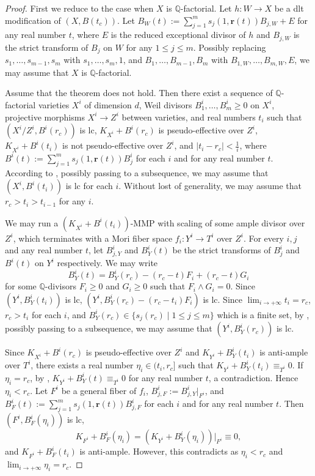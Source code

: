 \documentclass[11pt]{amsart}
\numberwithin{equation}{section}
\newcommand{\Qq}{\mathbb{Q}}
\theoremstyle{definition}
\theoremstyle{definition}
\begin{document}
\begin{proof}
First we reduce to the case when $X$ is $\Qq$-factorial. Let $h: W\rightarrow X$ be a dlt modification of $(X,B(t_c))$. Let $B_W(t):=\sum_{j=1}^ms_j(1,\bm{r}(t))B_{j,W}+E$ for any real number $t$, where $E$ is the reduced exceptional divisor of $h$ and $B_{j,W}$ is the strict transform of $B_j$ on $W$ for any $1\le j\le m$. Possibly replacing $s_1,\dots,s_{m-1},s_m$ with $s_1,\dots,s_{m},1$, and $B_1,\dots,B_{m-1},B_m$ with $B_{1,W},\dots,B_{m,W},E$, we may assume that $X$ is $\Qq$-factorial.

Assume that the theorem does not hold. Then there exist a sequence of $\Qq$-factorial varieties $X^i$ of dimension $d$, Weil divisors $B_1^i,\dots,B_m^i\ge0$ on $X^i$, projective morphisms $X^i\to Z^i$ between varieties, and real numbers $t_i$ such that $(X^i/Z^i,B^i(r_c))$ is lc, $K_{X^i}+B^i(r_c)$ is pseudo-effective over $Z^i$, $K_{X^i}+B^i(t_i)$ is not pseudo-effective over $Z^i$, and $|t_i-r_c|<\frac{1}{i}$, where $B^i(t):=\sum_{j=1}^ms_j(1,\bm{r}(t))B^i_j$ for each $i$ and for any real number $t$. According to \cite[Corollary 5.5]{HLS19}, possibly passing to a subsequence, we may assume that  $(X^i,B^i(t_i))$ is lc for each $i$. Without lost of generality, we may assume that $r_c>t_i>t_{i-1}$ for any $i$.

We may run a $(K_{X^i}+B^i(t_i))$-MMP with scaling of some ample divisor over $Z^i$, which terminates with a Mori fiber space $f_i: Y^i\rightarrow T^i$ over $Z^i$. For every $i,j$ and any real number $t$, let $B^i_{j,Y}$ and $B^i_Y(t)$ be the strict transforms of $B^i_j$ and $B^i(t)$ on $Y^i$ respectively. We may write
$$B^i_Y(t)=B^i_Y(r_c)-(r_c-t)F_i+(r_c-t)G_i$$
for some $\Qq$-divisors $F_i\geq 0$ and $G_i\geq 0$ such that $F_i\wedge G_i=0$. Since $(Y^i,B^i_Y(t_i))$ is lc, $(Y^i,B^i_Y(r_c)-(r_c-t_i)F_i)$ is lc. Since $\lim_{i\rightarrow+\infty}t_i=r_c$, $r_c>t_i$ for each $i$, and $B^i_Y(r_c)\in\{s_j(r_c)\mid 1\le j\le m\}$ which is a finite set, by \cite[Theorem 1.4]{HMX14}, possibly passing to a subsequence, we may assume that $(Y^i,B^i_Y(r_c))$ is lc.

Since $K_{X^i}+B^i(r_c)$ is pseudo-effective over $Z^i$ and $K_{Y^i}+B^i_Y(t_i)$ is anti-ample over $T^i$, there exists a real number $\eta_i\in (t_i,r_c]$ such that $K_{Y^i}+B^i_Y(t_i)\equiv_{T^i}0$. If $\eta_i=r_c$, by \cite[Lemma 5.3]{HLS19}, $K_{Y^i}+B^i_Y(t)\equiv_{T^i}0$ for any real number $t$, a contradiction. Hence $\eta_i<r_c$. 
Let $F^i$ be a general fiber of $f_i$, $B^i_{j,F}:=B^i_{j,Y}|_{F^i}$, and $B^i_F(t):=\sum_{j=1}^ms_j(1,\bm{r}(t))B^i_{j,F}$ for each $i$ and for any real number $t$. Then $(F^i,B^i_{F}(\eta_i))$ is lc,
$$K_{F^i}+B^i_{F}(\eta_i)=(K_{Y^i}+B^i_Y(\eta_i))|_{F^i}\equiv 0,$$
and $K_{F^i}+B^i_{F}(t_i)$ is anti-ample. However, this contradicts \cite[Theorem 3.8]{Nak16} as $\eta_i<r_c$ and $\lim_{i\rightarrow+\infty}\eta_i=r_c$.
\end{proof}
\end{document}
